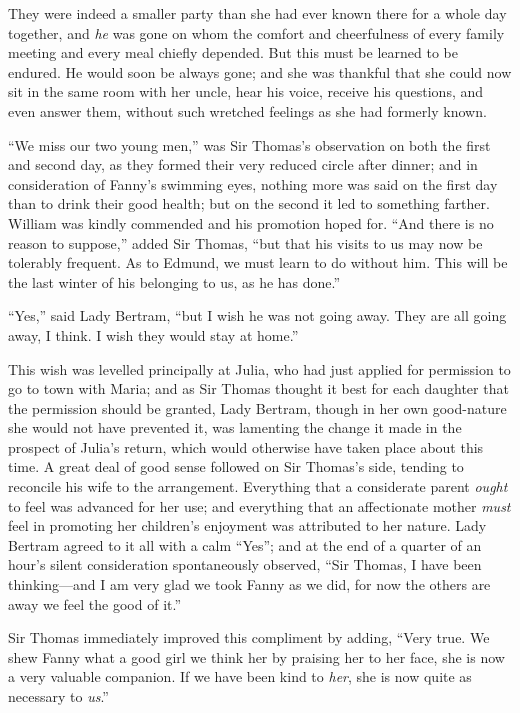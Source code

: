 They were indeed a smaller party than she had ever
known there for a whole day together, and \emph{he} was gone
on whom the comfort and cheerfulness of every family
meeting and every meal chiefly depended.  But this must
be learned to be endured.  He would soon be always gone;
and she was thankful that she could now sit in the same room
with her uncle, hear his voice, receive his questions,
and even answer them, without such wretched feelings
as she had formerly known.

``We miss our two young men,'' was Sir Thomas's observation
on both the first and second day, as they formed their
very reduced circle after dinner; and in consideration
of Fanny's swimming eyes, nothing more was said
on the first day than to drink their good health;
but on the second it led to something farther.
William was kindly commended and his promotion hoped for.
``And there is no reason to suppose,'' added Sir Thomas,
``but that his visits to us may now be tolerably frequent.
As to Edmund, we must learn to do without him.
This will be the last winter of his belonging to us,
as he has done.''

``Yes,'' said Lady Bertram, ``but I wish he was not going away.
They are all going away, I think.  I wish they would stay
at home.''

This wish was levelled principally at Julia, who had
just applied for permission to go to town with Maria;
and as Sir Thomas thought it best for each daughter that the
permission should be granted, Lady Bertram, though in her own
good-nature she would not have prevented it, was lamenting
the change it made in the prospect of Julia's return,
which would otherwise have taken place about this time.
A great deal of good sense followed on Sir Thomas's side,
tending to reconcile his wife to the arrangement.
Everything that a considerate parent \emph{ought} to feel was
advanced for her use; and everything that an affectionate
mother \emph{must} feel in promoting her children's enjoyment
was attributed to her nature.  Lady Bertram agreed to it
all with a calm ``Yes''; and at the end of a quarter of
an hour's silent consideration spontaneously observed,
``Sir Thomas, I have been thinking---and I am very glad we
took Fanny as we did, for now the others are away we feel
the good of it.''

Sir Thomas immediately improved this compliment by adding,
``Very true.  We shew Fanny what a good girl we think
her by praising her to her face, she is now a very
valuable companion.  If we have been kind to \emph{her},
she is now quite as necessary to \emph{us}.''

